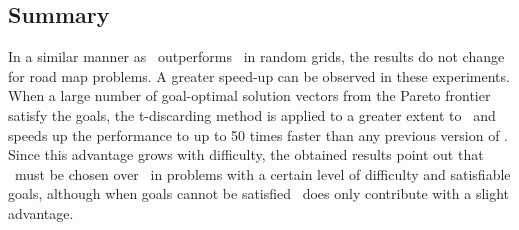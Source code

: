 \begin{table}
\caption{Class II experiments in road maps, runtimes in seconds of \lexgolex, \lexgolin, and \lexgote \ for two NY city problems.}
\label{tab:7-20}
\centering
{}
\end{table}

\subsection{Summary}
\label{chapEmpiricalAnalysis:subsec:summarydimacslexgote}

In a similar manner as \lexgote \ outperforms \lexgo \ in random grids, the results do not change for road map problems. A greater speed-up can be observed in these experiments. When a large number of goal-optimal solution vectors from the Pareto frontier satisfy the goals, the t-discarding method is applied to a greater extent to \lexgote \ and speeds up the performance to up to 50 times faster than any previous version of \lexgo. Since this advantage grows with difficulty, the obtained results point out that \lexgote \ must be chosen over \lexgo \ in problems with a certain level of difficulty and satisfiable goals, although when goals cannot be satisfied \lexgote \ does only contribute with a slight advantage. 

